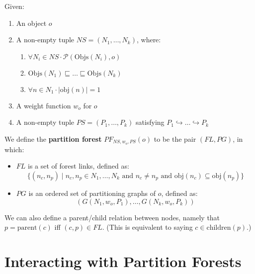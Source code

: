 \begin{definition}
Given:

\begin{enumerate}

\item An object $o$
\item A non-empty tuple $\textit{NS} = (N_1,\ldots,N_k)$, where:

\begin{enumerate}

\item $\forall N_i \in \textit{NS} \cdot \mathcal{P}(\mbox{Objs}(N_i),o)$
\item $\mbox{Objs}(N_1) \sqsubseteq \ldots \sqsubseteq \mbox{Objs}(N_k)$ 
\item $\forall n \in N_1 \cdot |\mbox{obj}(n)| = 1$

\end{enumerate}

\item A weight function $w_o$ for $o$
\item A non-empty tuple $\textit{PS} = (P_1,\ldots,P_k)$ satisfying $P_1 \hookrightarrow \ldots \hookrightarrow P_k$

\end{enumerate}

\noindent We define the \textbf{partition forest} $PF_{\textit{NS},w_o,\textit{PS}}(o)$ to be the pair $(\textit{FL},\textit{PG})$, in which:

\begin{itemize}

\item $\textit{FL}$ is a set of forest links, defined as:
%
\[
\{(n_c,n_p) \; | \; n_c, n_p \in N_1,\ldots,N_k \mbox{ and } n_c \ne n_p \mbox{ and } \mbox{obj}(n_c) \subseteq \mbox{obj}(n_p)\}
\]

\item $\textit{PG}$ is an ordered set of partitioning graphs of $o$, defined as:
%
\[
(G(N_1,w_o,P_1),\ldots,G(N_k,w_o,P_k))
\]

\end{itemize}

\end{definition}

\noindent We can also define a parent/child relation between nodes, namely that $p = \mbox{parent}(c)$ iff $(c,p) \in \textit{FL}$. (This is equivalent to saying $c \in \mbox{children}(p)$.)

\section{Interacting with Partition Forests}

